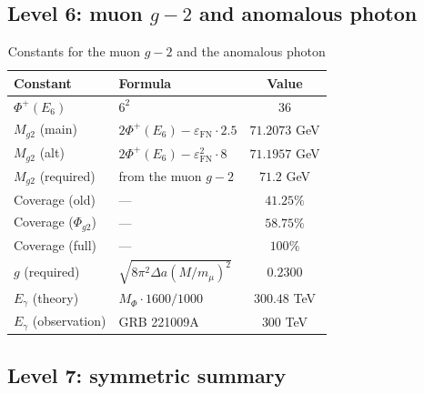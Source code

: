 \documentclass[11pt,a4paper]{article}
\theoremstyle{definition}
\begin{document}
\subsection{Level 6: muon \texorpdfstring{$g-2$}{g-2} and anomalous photon}
\label{app:level-6-g2}

\begin{table}[ht]
\centering
\caption{\texorpdfstring{Constants for the muon $g-2$ and the anomalous photon}{Constants for muon g-2 and anomalous photon}}
\label{tab:app-g2}
\begin{tabular}{llc}
\toprule
Constant & Formula & Value \\
\midrule
$\Phi^+(E_6)$ & $6^2$ & $36$ \\
$M_{g2}$ (main) & $2\Phi^+(E_6) - \varepsilon_{\text{FN}} \cdot 2.5$ & $71.2073$ GeV \\
$M_{g2}$ (alt) & $2\Phi^+(E_6) - \varepsilon_{\text{FN}}^2 \cdot 8$ & $71.1957$ GeV \\
$M_{g2}$ (required) & from the muon $g-2$ & $71.2$ GeV \\
Coverage (old) & — & $41.25\%$ \\
Coverage ($\Phi_{g2}$) & — & $58.75\%$ \\
Coverage (full) & — & $100\%$ \\
$g$ (required) & $\sqrt{8\pi^2 \Delta a (M/m_\mu)^2}$ & $0.2300$ \\
\midrule
$E_\gamma$ (theory) & $M_\Phi \cdot 1600/1000$ & $300.48$ TeV \\
$E_\gamma$ (observation) & GRB 221009A & $300$ TeV \\
\bottomrule
\end{tabular}
\end{table}

\subsection{Level 7: symmetric summary}
\label{app:level-7-summary}
\end{document}
